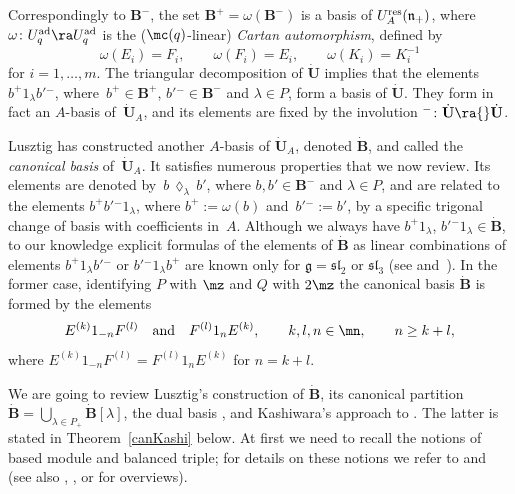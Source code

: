 Correspondingly to $\mathbf{B}^-$, the set $\mathbf{B}^+ = \omega(\mathbf{B}^-)$ is a basis of $U_A^{\rm res}(\mathfrak{n}_+)$, where $\omega\colon U_q^{\rm ad} \ra U_q^{\rm ad}$ is the ($\mc(q)$-linear) {\it Cartan automorphism}, defined by
\[\omega(E_i)=F_i , \qquad \omega(F_i) = E_i , \qquad \omega(K_i)=K_i^{-1}\]
for $i=1,\dots,m$. The triangular decomposition of $\dot{\mathbf{U}}$ implies that the elements $b^+1_\lambda b'{}^-$, where~${b^+ \in \mathbf{B}^+}$, $b'{}^- \in \mathbf{B}^-$ and $\lambda\in P$, form a basis of $\dot{\mathbf{U}}$. They form in fact an $A$-basis of~$\dot{\mathbf{U}}_A$, and its elements are fixed by the involution ${}^-\colon \dot{\mathbf{U}} {}\ra{} \dot{\mathbf{U}}$.

Lusztig has constructed another $A$-basis of $\dot{\mathbf{U}}_A$, denoted $\dot{\mathbf{B}}$, and called the {\it canonical basis} of~$\dot{\mathbf{U}}_A$. It satisfies numerous properties that we now review. Its elements are denoted by~${b\,\lozenge_\lambda\, b'}$, where $b, b' \in \mathbf{B}^-$ and $\lambda\in P$, and are related to the elements $b^+b'{}^-1_\lambda$, where $b^+ := \omega(b)$ and~${b'{}^-:=b'}$, by a specific trigonal change of basis with coefficients in~$A$. Although we always have $b^+1_\lambda$, $b'{}^-1_\lambda \in \dot{\mathbf{B}}$, to our knowledge explicit formulas of the elements of $\dot{\mathbf{B}}$ as linear combinations of elements $b^+1_\lambda b'{}^-$ or $b'{}^- 1_\lambda b^+$ are known only for $\mathfrak{g}={\mathfrak{sl}_2}$ or $\mathfrak{sl}_3$ (see \cite[Section~25.3]{Lusztig} and~\cite{Cui}). In the former case, identifying $P$ with $\mz$ and $Q$ with $2\mz$ the canonical basis $\dot{\mathbf{B}}$ is formed by the elements
\[%
E^{(k)}1_{-n}F^{(l)}\quad \text{and}\quad F^{(l)}1_nE^{(k)}, \qquad k,l,n\in \mn,\qquad n\geq k+l,
\]
where $E^{(k)}1_{-n}F^{(l)} = F^{(l)}1_nE^{(k)}$ for $n=k+l$.

We are going to review Lusztig's construction of $\dot{\mathbf{B}}$, its canonical partition $\dot{\mathbf{B}} = \bigcup_{\lambda\in P_+} \dot{\mathbf{B}} [\lambda]$, the dual basis , and Kashiwara's approach to  \cite{Kashiwara2,Kashiwara3}. The latter is stated in Theorem~\ref{canKashi} below. At first we need to recall the notions of based module and balanced triple; for details on these notions we refer to \cite[Chapter~27]{Lusztig} and \cite{Kashiwara2} (see also \cite{Kashiwara4}, \cite[Sections~3.15 and~3.16]{VY}, or \cite[Chapter~14]{CP} for overviews).

